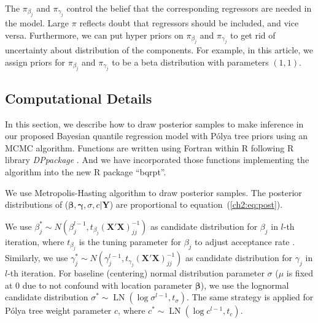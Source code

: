 \documentclass[12pt]{article}
\newcommand{\polya}{P\'{o}lya}
\DeclareMathOperator{\LN}{LN}
\begin{document}
The $\pi_{\beta_j}$ and $\pi_{\gamma_j}$ control the belief that the
corresponding regressors are needed in the model. Large $\pi$ reflects
doubt that regressors should be included, and vice versa. Furthermore,
we can put hyper priors on $\pi_{\beta_j}$ and $\pi_{\gamma_j}$ to get
rid of uncertainty about distribution of the components.  For example,
in this article, we assign priors for $\pi_{\beta_j}$ and
$\pi_{\gamma_j}$ to be a beta distribution with parameters $(1,1)$.

\subsection{Computational Details}\label{ch2:sec:computation}

In this section, we describe how to draw posterior samples to make
inference in our proposed Bayesian quantile regression model with
\polya{} tree priors using an MCMC algorithm. Functions are written
using Fortran within R \citep{R} following R library
\textit{DPpackage} \citep{DPpackage}. And we have incorporated those
functions implementing the algorithm into the new R \citep{R} package
``bqrpt''.

We use Metropolis-Hasting algorithm to draw posterior samples. The
posterior distributions of ($\bm \beta, \bm \gamma, \sigma, c | \bm
Y$) are proportional to equation~(\ref{ch2:eq:post}).

We use $\beta_j^* \sim N(\beta_j^{l-1}, t_{\beta_j}
(\bm{X'X})^{-1}_{jj})$ as candidate distribution for $\beta_j$ in
$l$-th iteration, where $t_{\beta_j}$ is the tuning parameter for
$\beta_j$ to adjust acceptance rate \citep{jara2009}.  Similarly, we
use $\gamma_j^* \sim N(\gamma_j^{l-1},
t_{\gamma_j}(\bm{X'X})^{-1}_{jj})$ as candidate distribution for
$\gamma_j$ in $l$-th iteration.  For baseline (centering) normal
distribution parameter $\sigma$ ($\mu$ is fixed at 0 due to not
confound with location parameter $\bm \beta$), we use the lognormal
candidate distribution $\sigma^* \sim \LN(\log \sigma^{l-1},
t_{\sigma})$. The same strategy is applied for \polya{} tree weight
parameter $c$, where $c^* \sim \LN(\log c^{l-1}, t_c)$.
\end{document}
